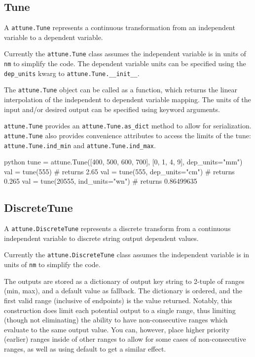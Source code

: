 \hypertarget{tune}{%
\subsection{Tune}\label{tune}}

A \texttt{attune.Tune} represents a continuous
transformation from an independent variable to a dependent variable.

Currently the \texttt{attune.Tune} class assumes the
independent variable is in units of \texttt{nm} to simplify the code.
The dependent variable units can be specified using the
\texttt{dep\_units} kwarg to
\texttt{attune.Tune.\_\_init\_\_}.

The \texttt{attune.Tune} object can be called as a
function, which returns the linear interpolation of the independent to
dependent variable mapping. The units of the input and/or desired output
can be specified using keyword arguments.

\texttt{attune.Tune} provides an
\texttt{attune.Tune.as\_dict} method to allow for
serialization. \texttt{attune.Tune} also provides
convenience attributes to access the limits of the tune:
\texttt{attune.Tune.ind\_min} and
\texttt{attune.Tune.ind\_max}.

\begin{codefragment}{python}
tune = attune.Tune([400, 500, 600, 700], [0, 1, 4, 9], dep_units="mm")
val = tune(555) # returns 2.65
val = tune(555, dep_units="cm") # returns 0.265
val = tune(20555, ind_units="wn") # returns 0.86499635
\end{codefragment}

\hypertarget{discretetune}{%
\subsection{DiscreteTune}\label{discretetune}}

A \texttt{attune.DiscreteTune} represents a discrete
transform from a continuous independent variable to discrete string
output dependent values.

Currently the \texttt{attune.DiscreteTune} class
assumes the independent variable is in units of \texttt{nm} to simplify
the code.

The outputs are stored as a dictionary of output key string to 2-tuple
of ranges (min, max), and a default value as fallback. The dictionary is
ordered, and the first valid range (inclusive of endpoints) is the value
returned. Notably, this construction does limit each potential output to
a single range, thus limiting (though not eliminating) the ability to
have non-consecutive ranges which evaluate to the same output value. You
can, however, place higher priority (earlier) ranges inside of other
ranges to allow for some cases of non-consecutive ranges, as well as
using default to get a similar effect.

